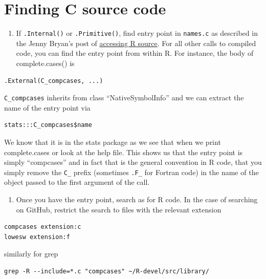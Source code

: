 \documentclass[
]{book}
\providecommand{\tightlist}{%
  \setlength{\itemsep}{0pt}\setlength{\parskip}{0pt}}
\begin{document}
\hypertarget{finding-c-source-code}{%
\section{Finding C source code}\label{finding-c-source-code}}

\begin{enumerate}
\def\labelenumi{\arabic{enumi}.}
\tightlist
\item
  If \texttt{.Internal()} or \texttt{.Primitive()}, find entry point in \texttt{names.c} as described in the Jenny Bryan's post of \href{https://github.com/jennybc/access-r-source}{accessing R source}. For all other calls to compiled code, you can find the entry point from within R. For instance, the body of complete.cases() is
\end{enumerate}

\begin{verbatim}
.External(C_compcases, ...)
\end{verbatim}

\texttt{C\_compcases} inherits from class ``NativeSymbolInfo'' and we can extract the name of the entry point via

\begin{verbatim}
stats:::C_compcases$name
\end{verbatim}

We know that it is in the stats package as we see that when we print complete.cases or look at the help file. This shows us that the entry point is simply ``compcases'' and in fact that is the general convention in R code, that you simply remove the \texttt{C\_} prefix (sometimes \texttt{.F\_} for Fortran code) in the name of the object passed to the first argument of the call.

\begin{enumerate}
\def\labelenumi{\arabic{enumi}.}
\setcounter{enumi}{1}
\tightlist
\item
  Once you have the entry point, search as for R code. In the case of searching on GitHub, restrict the search to files with the relevant extension
\end{enumerate}

\begin{verbatim}
compcases extension:c
lowesw extension:f
\end{verbatim}

similarly for grep

\begin{verbatim}
grep -R --include=*.c "compcases" ~/R-devel/src/library/
\end{verbatim}
\end{document}
